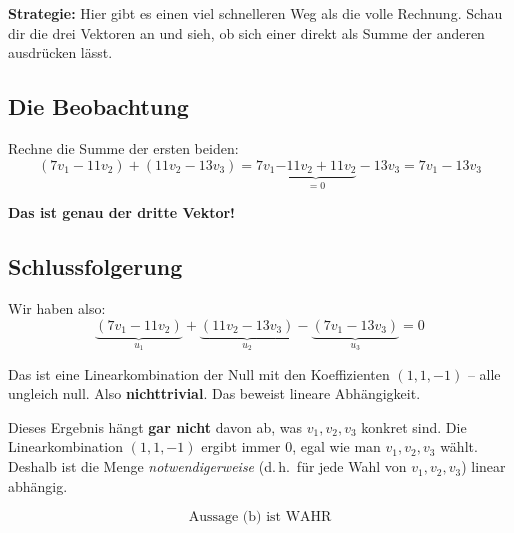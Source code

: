 \documentclass[a4paper,12pt]{article}
\begin{document}
\textbf{Strategie:} Hier gibt es einen viel schnelleren Weg als die volle Rechnung. Schau dir die drei Vektoren an und sieh, ob sich einer direkt als Summe der anderen ausdr\"ucken l\"asst.

\subsection*{Die Beobachtung}

Rechne die Summe der ersten beiden:
\[
(7v_1 - 11v_2) + (11v_2 - 13v_3) = 7v_1 \underbrace{-11v_2 + 11v_2}_{= 0} - 13v_3 = 7v_1 - 13v_3
\]

\textbf{Das ist genau der dritte Vektor!}

\subsection*{Schlussfolgerung}

Wir haben also:
\[
\underbrace{(7v_1 - 11v_2)}_{u_1} + \underbrace{(11v_2 - 13v_3)}_{u_2} - \underbrace{(7v_1 - 13v_3)}_{u_3} = 0
\]

Das ist eine Linearkombination der Null mit den Koeffizienten $(1, 1, -1)$ -- alle ungleich null. Also \textbf{nichttrivial}. Das beweist lineare Abh\"angigkeit.

\begin{merkbox}[title={Das Wichtigste}]
Dieses Ergebnis h\"angt \textbf{gar nicht} davon ab, was $v_1, v_2, v_3$ konkret sind. Die Linearkombination $(1, 1, -1)$ ergibt immer $0$, egal wie man $v_1, v_2, v_3$ w\"ahlt. Deshalb ist die Menge \emph{notwendigerweise} (d.\,h.\ f\"ur jede Wahl von $v_1, v_2, v_3$) linear abh\"angig.
\end{merkbox}

\[
\boxed{\text{Aussage (b) ist WAHR}}
\]
\end{document}
